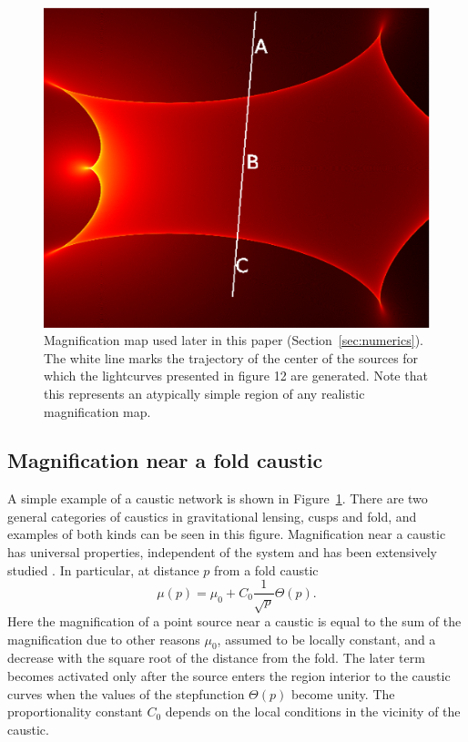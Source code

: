 \documentclass[usenatbib]{mn2e}
\begin{document}
\begin{figure}
\centering
\includegraphics[width=0.9\hsize]{figures/IRIS567_path.eps}
\caption{\label{fig:magnification_map} Magnification map used later in
  this paper (Section~\ref{sec:numerics}). The white line marks the
  trajectory of the center of the sources for which the lightcurves
  presented in figure 12 are generated.  Note that this represents an
  atypically simple region of any realistic magnification map.}
\end{figure}


\subsection{Magnification near a fold caustic}

A simple example of a caustic network is shown in
Figure~\ref{fig:magnification_map}.  There are two general categories
of caustics in gravitational lensing, cusps and fold, and examples of
both kinds can be seen in this figure.  Magnification near a caustic
has universal properties, independent of the system and has been
extensively studied
\citep{1986ApJ...310..568B,1992A&A...260....1S,2002ApJ...574..970G,2002ApJ...580..468G}.
In particular, at distance $p$ from a fold caustic
\begin {equation}
 \mu(p) = \mu_0 + C_0 \frac{1}{\sqrt{p}} \Theta(p).
\end {equation}
Here the magnification of a point source near a caustic is equal to
the sum of the magnification due to other reasons $\mu_0$, assumed to
be locally constant, and a decrease with the square root of the
distance from the fold. The later term becomes activated only after
the source enters the region interior to the caustic curves when the
values of the stepfunction $\Theta(p)$ become unity. The
proportionality constant $C_0$ depends on the local conditions in the
vicinity of the caustic.
\end{document}
